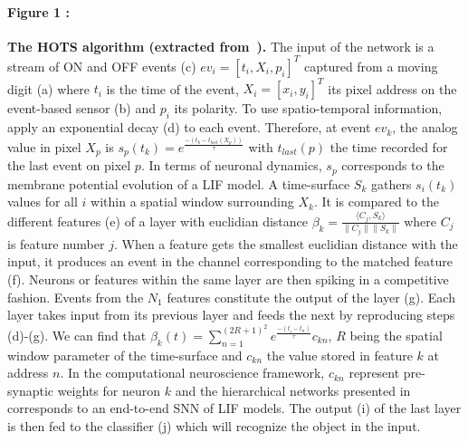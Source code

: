 \documentclass[12pt]{article}
\newcommand{\citep}[1]{\parencite{#1}}
\begin{document}
\paragraph*{Figure 1 : }
\textbf{The HOTS algorithm (extracted from~\citep{Lagorce17}).}
The input of the network is a stream of ON and OFF events (c) $ev_i = [t_i,X_i,p_i]^T$ captured from a moving digit (a) where $t_i$ is the time of the event, $X_i=[x_i,y_i]^T$ its pixel address on the event-based sensor (b) and $p_i$ its polarity. To use spatio-temporal information,~\citep{Lagorce17} apply an exponential decay (d) to each event. Therefore, at event $ev_k$, the analog value in pixel $X_p$ is $s_p(t_k) = e^\frac{-(t_k-t_{last}(X_p))}{\tau}$ with $t_{last}(p)$ the time recorded for the last event on pixel $p$. In terms of neuronal dynamics, $s_p$ corresponds to the membrane potential evolution of a LIF model. A time-surface $S_k$ gathers $s_i(t_k)$ values for all $i$ within a spatial window surrounding $X_k$. It is compared to the different features (e) of a layer with euclidian distance $ \beta_k = \frac{\langle C_j,S_k\rangle}{\|C_j\|\|S_k\|}$ where $C_j$ is feature number $j$. When a feature gets the smallest euclidian distance with the input, it produces an event in the channel corresponding to the matched feature (f). Neurons or features within the same layer are then spiking in a competitive fashion. Events from the $N_1$ features constitute the output of the layer (g). Each layer takes input from its previous layer and feeds the next by reproducing steps (d)-(g). We can find that $ \beta_k(t) =  \sum_{n=1}^{(2R+1)^2}e^\frac{-(t_i-t_n)}{\tau}c_{kn}$, $R$ being the spatial window parameter of the time-surface and $c_{kn}$ the value stored in feature $k$ at address $n$. In the computational neuroscience framework, $c_{kn}$ represent pre-synaptic weights for neuron $k$ and the hierarchical networks presented in~\citep{Lagorce17} corresponds to an end-to-end SNN of LIF models. The output (i) of the last layer is then fed to the classifier (j) which will recognize the object in the input.
\end{document}

